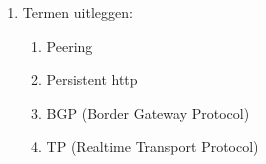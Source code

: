 \begin{enumerate}
\begin{enumerate}
\end{enumerate}

\clearpage

\item Termen uitleggen:

    \begin{enumerate}
         \item Peering

        \item Persistent http

        \item BGP (Border Gateway Protocol)

        \item TP (Realtime Transport Protocol)

        \end{enumerate}
\end{enumerate}


